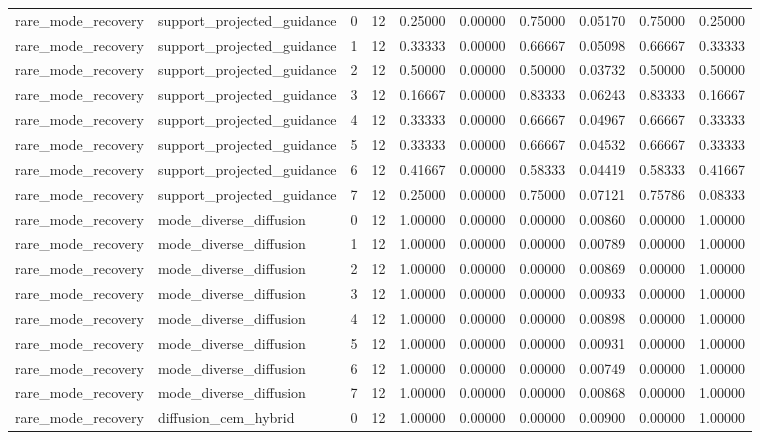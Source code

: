 \documentclass{article}
\begin{document}
\begin{table}[tbp]
{\begin{tabular}{llllllllll}
rare\_mode\_recovery & support\_projected\_guidance & 0 & 12 & 0.25000 & 0.00000 & 0.75000 & 0.05170 & 0.75000 & 0.25000 \\
rare\_mode\_recovery & support\_projected\_guidance & 1 & 12 & 0.33333 & 0.00000 & 0.66667 & 0.05098 & 0.66667 & 0.33333 \\
rare\_mode\_recovery & support\_projected\_guidance & 2 & 12 & 0.50000 & 0.00000 & 0.50000 & 0.03732 & 0.50000 & 0.50000 \\
rare\_mode\_recovery & support\_projected\_guidance & 3 & 12 & 0.16667 & 0.00000 & 0.83333 & 0.06243 & 0.83333 & 0.16667 \\
rare\_mode\_recovery & support\_projected\_guidance & 4 & 12 & 0.33333 & 0.00000 & 0.66667 & 0.04967 & 0.66667 & 0.33333 \\
rare\_mode\_recovery & support\_projected\_guidance & 5 & 12 & 0.33333 & 0.00000 & 0.66667 & 0.04532 & 0.66667 & 0.33333 \\
rare\_mode\_recovery & support\_projected\_guidance & 6 & 12 & 0.41667 & 0.00000 & 0.58333 & 0.04419 & 0.58333 & 0.41667 \\
rare\_mode\_recovery & support\_projected\_guidance & 7 & 12 & 0.25000 & 0.00000 & 0.75000 & 0.07121 & 0.75786 & 0.08333 \\
rare\_mode\_recovery & mode\_diverse\_diffusion & 0 & 12 & 1.00000 & 0.00000 & 0.00000 & 0.00860 & 0.00000 & 1.00000 \\
rare\_mode\_recovery & mode\_diverse\_diffusion & 1 & 12 & 1.00000 & 0.00000 & 0.00000 & 0.00789 & 0.00000 & 1.00000 \\
rare\_mode\_recovery & mode\_diverse\_diffusion & 2 & 12 & 1.00000 & 0.00000 & 0.00000 & 0.00869 & 0.00000 & 1.00000 \\
rare\_mode\_recovery & mode\_diverse\_diffusion & 3 & 12 & 1.00000 & 0.00000 & 0.00000 & 0.00933 & 0.00000 & 1.00000 \\
rare\_mode\_recovery & mode\_diverse\_diffusion & 4 & 12 & 1.00000 & 0.00000 & 0.00000 & 0.00898 & 0.00000 & 1.00000 \\
rare\_mode\_recovery & mode\_diverse\_diffusion & 5 & 12 & 1.00000 & 0.00000 & 0.00000 & 0.00931 & 0.00000 & 1.00000 \\
rare\_mode\_recovery & mode\_diverse\_diffusion & 6 & 12 & 1.00000 & 0.00000 & 0.00000 & 0.00749 & 0.00000 & 1.00000 \\
rare\_mode\_recovery & mode\_diverse\_diffusion & 7 & 12 & 1.00000 & 0.00000 & 0.00000 & 0.00868 & 0.00000 & 1.00000 \\
rare\_mode\_recovery & diffusion\_cem\_hybrid & 0 & 12 & 1.00000 & 0.00000 & 0.00000 & 0.00900 & 0.00000 & 1.00000 \\

\end{tabular}}
\end{table}
\end{document}
